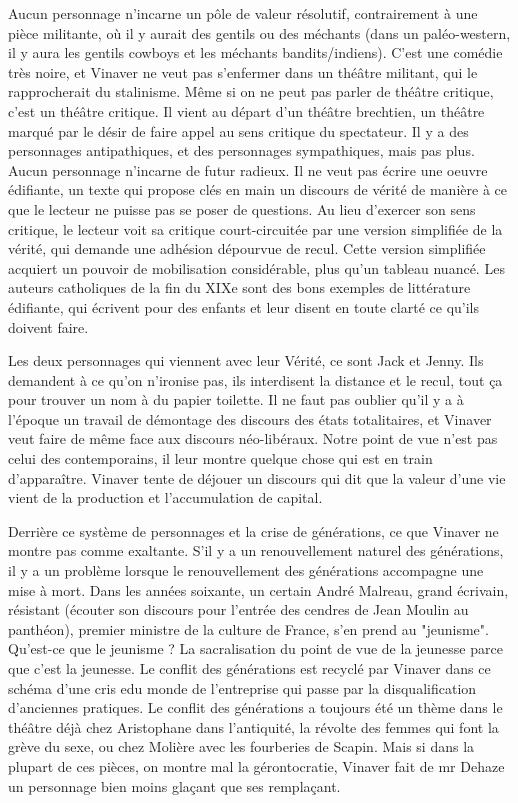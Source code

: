 \documentclass[a4paper,12pt]{book}
\begin{document}
\par Aucun personnage n'incarne un pôle de valeur résolutif, contrairement à une pièce militante, où il y aurait des gentils ou des méchants (dans un paléo-western, il y aura les gentils cowboys et les méchants bandits/indiens). C'est une comédie très noire, et Vinaver ne veut pas s'enfermer dans un théâtre militant, qui le rapprocherait du stalinisme. Même si on ne peut pas parler de théâtre critique, c'est un théâtre critique. Il vient au départ d'un théâtre brechtien, un théâtre marqué par le désir de faire appel au sens critique du spectateur. Il y a des personnages antipathiques, et des personnages sympathiques, mais pas plus. Aucun personnage n'incarne de futur radieux. Il ne veut pas écrire une oeuvre édifiante, un texte qui propose clés en main un discours de vérité de manière à ce que le lecteur ne puisse pas se poser de questions. Au lieu d'exercer son sens critique, le lecteur voit sa critique court-circuitée par une version simplifiée de la vérité, qui demande une adhésion dépourvue de recul. Cette version simplifiée acquiert un pouvoir de mobilisation considérable, plus qu'un tableau nuancé. Les auteurs catholiques de la fin du XIXe sont des bons exemples de littérature édifiante, qui écrivent pour des enfants et leur disent en toute clarté ce qu'ils doivent faire.
\par Les deux personnages qui viennent avec leur Vérité, ce sont Jack et Jenny. Ils demandent à ce qu'on n'ironise pas, ils interdisent la distance et le recul, tout ça pour trouver un nom à du papier toilette. Il ne faut pas oublier qu'il y a à l'époque un travail de démontage des discours des états totalitaires, et Vinaver veut faire de même face aux discours néo-libéraux. Notre point de vue n'est pas celui des contemporains, il leur montre quelque chose qui est en train d'apparaître. Vinaver tente de déjouer un discours qui dit que la valeur d'une vie vient de la production et l'accumulation de capital.
\par Derrière ce système de personnages et la crise de générations, ce que Vinaver ne montre pas comme exaltante. S'il y a un renouvellement naturel des générations, il y a un problème lorsque le renouvellement des générations accompagne une mise à mort. Dans les années soixante, un certain André Malreau, grand écrivain, résistant (écouter son discours pour l'entrée des cendres de Jean Moulin au panthéon), premier ministre de la culture de France, s'en prend au "jeunisme". Qu'est-ce que le jeunisme ? La sacralisation du point de vue de la jeunesse parce que c'est la jeunesse. Le conflit des générations est recyclé par Vinaver dans ce schéma d'une cris edu monde de l'entreprise qui passe par la disqualification d'anciennes pratiques. Le conflit des générations a toujours été un thème dans le théâtre déjà chez Aristophane dans l'antiquité, la révolte des femmes qui font la grève du sexe, ou chez Molière avec les fourberies de Scapin. Mais si dans la plupart de ces pièces, on montre mal la gérontocratie, Vinaver fait de mr Dehaze un personnage bien moins glaçant que ses remplaçant.
\end{document}
